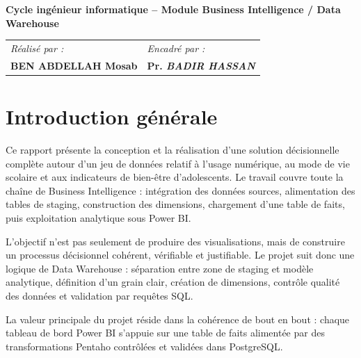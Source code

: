 \documentclass[11pt,a4paper]{report}
\newcommand{\AuthorNames}{BEN ABDELLAH Mosab}
\newcommand{\Supervisor}{Pr. \textit{BADIR HASSAN}}
\newcommand{\Context}{Cycle ingénieur informatique -- Module Business Intelligence / Data Warehouse}
\begin{document}
\begin{titlepage}
\begin{minipage}{0.67\paperwidth}
  \begin{tcolorbox}[colback=white,colframe=mainblue,boxrule=0.9pt,width=0.95\textwidth,arc=3pt,enhanced]
    \centering\bfseries\Context
  \end{tcolorbox}

  \vspace{1.45cm}
  \begin{tabular}{p{}p{}}
    \small\itshape Réalisé par : & \small\itshape Encadré par : \\
    \bfseries\AuthorNames & \bfseries\Supervisor
  \end{tabular}
\end{minipage}
\restoregeometry
\end{titlepage}

\setcounter{tocdepth}{2}
{\hypersetup{linkcolor=black}\tableofcontents}
\newpage

\chapter*{Introduction générale}

Ce rapport présente la conception et la réalisation d'une solution décisionnelle complète autour d'un jeu de données relatif à l'usage numérique, au mode de vie scolaire et aux indicateurs de bien-être d'adolescents. Le travail couvre toute la chaîne de Business Intelligence : intégration des données sources, alimentation des tables de staging, construction des dimensions, chargement d'une table de faits, puis exploitation analytique sous Power BI.

L'objectif n'est pas seulement de produire des visualisations, mais de construire un processus décisionnel cohérent, vérifiable et justifiable. Le projet suit donc une logique de Data Warehouse : séparation entre zone de staging et modèle analytique, définition d'un grain clair, création de dimensions, contrôle qualité des données et validation par requêtes SQL.

\begin{notebox}
La valeur principale du projet réside dans la cohérence de bout en bout : chaque tableau de bord Power BI s'appuie sur une table de faits alimentée par des transformations Pentaho contrôlées et validées dans PostgreSQL.
\end{notebox}

\end{document}
